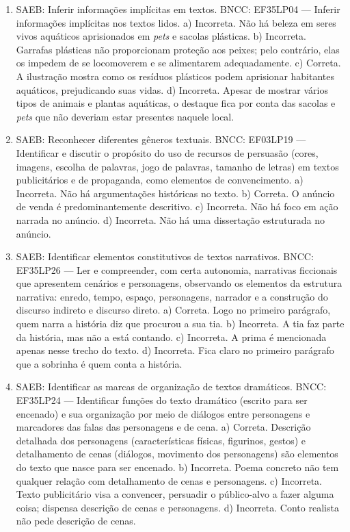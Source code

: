 \begin{enumerate}
\item
SAEB: Inferir informações implícitas em textos. BNCC: EF35LP04 --- Inferir informações implícitas nos textos lidos. a) Incorreta. Não há beleza em seres vivos aquáticos aprisionados em \emph{pets} e sacolas plásticas. b) Incorreta. Garrafas plásticas não proporcionam proteção aos peixes; pelo contrário, elas os impedem de se locomoverem e se alimentarem adequadamente. c) Correta. A ilustração mostra como os resíduos plásticos podem aprisionar habitantes aquáticos, prejudicando suas vidas. d) Incorreta. Apesar de mostrar vários tipos de animais e plantas aquáticas, o destaque fica por conta das sacolas e \emph{pets} que não deveriam estar presentes naquele local.

\item
SAEB: Reconhecer diferentes gêneros textuais. BNCC: EF03LP19 --- Identificar e discutir o propósito do uso de recursos de persuasão (cores, imagens, escolha de palavras, jogo de palavras, tamanho de letras) em textos publicitários e de propaganda, como elementos de convencimento. a) Incorreta. Não há argumentações históricas no texto. b) Correta. O anúncio de venda é predominantemente descritivo. c) Incorreta. Não há foco em ação narrada no anúncio. d) Incorreta. Não há uma dissertação estruturada no anúncio.

\item
SAEB: Identificar elementos constitutivos de textos narrativos. BNCC: EF35LP26 --- Ler e compreender, com certa autonomia, narrativas ficcionais que apresentem cenários e personagens, observando os elementos da estrutura narrativa: enredo, tempo, espaço, personagens, narrador e a construção do discurso indireto e discurso direto. a) Correta. Logo no primeiro parágrafo, quem narra a história diz que procurou a sua tia. b) Incorreta. A tia faz parte da história, mas não a está contando. c) Incorreta. A prima é mencionada apenas nesse trecho do texto. d) Incorreta. Fica claro no primeiro parágrafo que a sobrinha é quem conta a história.

\item
SAEB: Identificar as marcas de organização de textos dramáticos. BNCC: EF35LP24 --- Identificar funções do texto dramático (escrito para ser encenado) e sua organização por meio de diálogos entre personagens e marcadores das falas das personagens e de cena. a) Correta. Descrição detalhada dos personagens (características físicas, figurinos, gestos) e detalhamento de cenas (diálogos, movimento dos personagens) são elementos do texto que nasce para ser encenado. b) Incorreta. Poema concreto não tem qualquer relação com detalhamento de cenas e personagens. c) Incorreta. Texto publicitário visa a convencer, persuadir o público-alvo a fazer alguma coisa; dispensa descrição de cenas e personagens.
d) Incorreta. Conto realista não pede descrição de cenas.


\end{enumerate}
